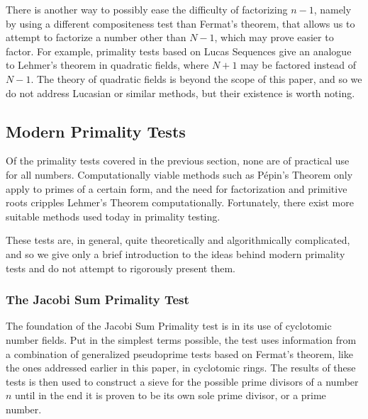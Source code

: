 \documentclass{article}
\begin{document}
\par There is another way to possibly ease the difficulty of factorizing $n - 1$, namely by using a different compositeness test than Fermat's theorem, that allows us to attempt to factorize a number other than $N - 1$, which may prove easier to factor. For example, primality tests based on Lucas Sequences give an analogue to Lehmer's theorem in quadratic fields, where $N+1$ may be factored instead of $N-1$. The theory of quadratic fields is beyond the scope of this paper, and so we do not address Lucasian or similar methods, but their existence is worth noting.



\subsection{Modern Primality Tests}

\par Of the primality tests covered in the previous section, none are of practical use for all numbers. Computationally viable methods such as P\'{e}pin's Theorem only apply to primes of a certain form, and the need for factorization and primitive roots cripples Lehmer's Theorem computationally. Fortunately, there exist more suitable methods used today in primality testing. 
\par These tests are, in general, quite theoretically and algorithmically complicated, and so we give only a brief introduction to the ideas behind modern primality tests and do not attempt to rigorously present them.

\subsubsection{The Jacobi Sum Primality Test}

\par The foundation of the Jacobi Sum Primality test is in its use of cyclotomic number fields. Put in the simplest terms possible, the test uses information from a combination of generalized pseudoprime tests based on Fermat's theorem, like the ones addressed earlier in this paper, in cyclotomic rings. The results of these tests is then used to construct a sieve for the possible prime divisors of a number $n$ until in the end it is proven to be its own sole prime divisor, or a prime number. 
\end{document}
